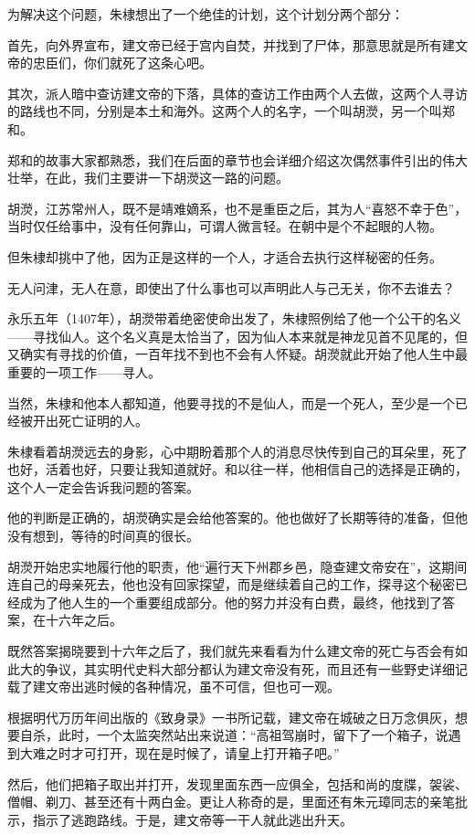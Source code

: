 \begin{multicols}{\theparacolNo}
为解决这个问题，朱棣想出了一个绝佳的计划，这个计划分两个部分：

首先，向外界宣布，建文帝已经于宫内自焚，并找到了尸体，那意思就是所有建文帝的忠臣们，你们就死了这条心吧。

其次，派人暗中查访建文帝的下落，具体的查访工作由两个人去做，这两个人寻访的路线也不同，分别是本土和海外。这两个人的名字，一个叫胡濙，另一个叫郑和。

郑和的故事大家都熟悉，我们在后面的章节也会详细介绍这次偶然事件引出的伟大壮举，在此，我们主要讲一下胡濙这一路的问题。

胡濙，江苏常州人，既不是靖难嫡系，也不是重臣之后，其为人“喜怒不幸于色”，当时仅任给事中，没有任何靠山，可谓人微言轻。在朝中是个不起眼的人物。

但朱棣却挑中了他，因为正是这样的一个人，才适合去执行这样秘密的任务。

无人问津，无人在意，即使出了什么事也可以声明此人与己无关，你不去谁去？

永乐五年（1407年），胡濙带着绝密使命出发了，朱棣照例给了他一个公干的名义——寻找仙人。这个名义真是太恰当了，因为仙人本来就是神龙见首不见尾的，但又确实有寻找的价值，一百年找不到也不会有人怀疑。胡濙就此开始了他人生中最重要的一项工作——寻人。

当然，朱棣和他本人都知道，他要寻找的不是仙人，而是一个死人，至少是一个已经被开出死亡证明的人。

朱棣看着胡濙远去的身影，心中期盼着那个人的消息尽快传到自己的耳朵里，死了也好，活着也好，只要让我知道就好。和以往一样，他相信自己的选择是正确的，这个人一定会告诉我问题的答案。

他的判断是正确的，胡濙确实是会给他答案的。他也做好了长期等待的准备，但他没有想到，等待的时间真的很长。

胡濙开始忠实地履行他的职责，他“遍行天下州郡乡邑，隐查建文帝安在”，这期间连自己的母亲死去，他也没有回家探望，而是继续着自己的工作，探寻这个秘密已经成为了他人生的一个重要组成部分。他的努力并没有白费，最终，他找到了答案，在十六年之后。

既然答案揭晓要到十六年之后了，我们就先来看看为什么建文帝的死亡与否会有如此大的争议，其实明代史料大部分都认为建文帝没有死，而且还有一些野史详细记载了建文帝出逃时候的各种情况，虽不可信，但也可一观。

根据明代万历年间出版的《致身录》一书所记载，建文帝在城破之日万念俱灰，想要自杀，此时，一个太监突然站出来说道：“高祖驾崩时，留下了一个箱子，说遇到大难之时才可打开，现在是时候了，请皇上打开箱子吧。”

然后，他们把箱子取出并打开，发现里面东西一应俱全，包括和尚的度牒，袈裟、僧帽、剃刀、甚至还有十两白金。更让人称奇的是，里面还有朱元璋同志的亲笔批示，指示了逃跑路线。于是，建文帝等一干人就此逃出升天。


\end{multicols}
